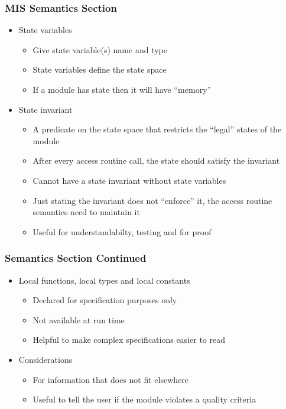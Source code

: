 \documentclass[t, 12pt, numbers, fleqn, handout]{beamer}
\begin{document}

\begin{frame}
\frametitle{MIS Semantics Section}

\begin{itemize}
\item State variables
\begin{itemize}
\item Give state variable(s) name and type
\item State variables define the state space
\item If a module has state then it will have ``memory''
\end{itemize}
\item State invariant
\begin{itemize}
\item A predicate on the state space that restricts the ``legal'' states of the module
\item After every access routine call, the state should satisfy the invariant
\item Cannot have a state invariant without state variables
\item Just stating the invariant does not ``enforce'' it, the access routine semantics need to maintain it
\item Useful for understandabilty, testing and for proof
\end{itemize}
\end{itemize}

\end{frame}


\begin{frame}
\frametitle{Semantics Section Continued}

\begin{itemize}
\item Local functions, local types and local constants
\begin{itemize}
\item Declared for specification purposes only
\item Not available at run time
\item Helpful to make complex specifications easier to read
\end{itemize}
\item Considerations
\begin{itemize}
\item For information that does not fit elsewhere
\item Useful to tell the user if the module violates a quality criteria
\end{itemize}
\end{itemize}

\end{frame}
\end{document}
